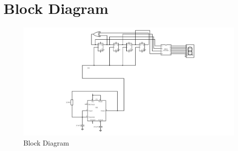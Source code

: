 \documentclass{article}
\begin{document}
\section{Block Diagram}
\begin{figure}[ht]
        \centering
        \includegraphics[width=0.8\linewidth]{hardware1.jpg}
        \caption{Block Diagram}
        \label{fig:view}
\end{figure}
\end{document}
